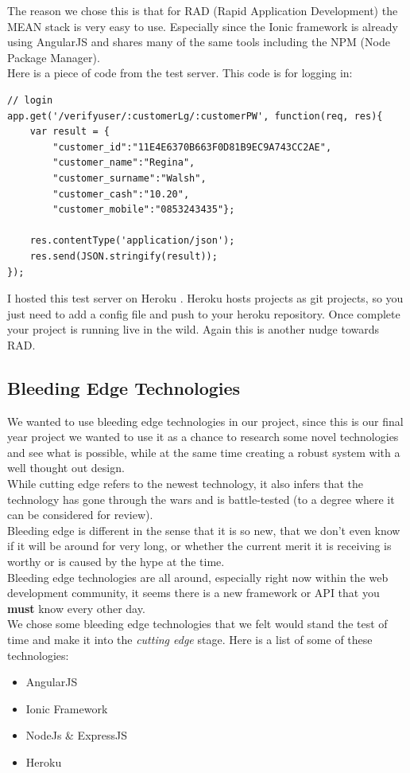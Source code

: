 The reason we chose this is that for RAD (Rapid Application Development) the MEAN stack is very easy to use.
Especially since the Ionic framework is already using AngularJS and shares many of the same tools including the NPM (Node Package Manager).
\\
\pagebreak
Here is a piece of code from the test server.
This code is for logging in:
\begin{verbatim}
// login
app.get('/verifyuser/:customerLg/:customerPW', function(req, res){
    var result = {
        "customer_id":"11E4E6370B663F0D81B9EC9A743CC2AE",
        "customer_name":"Regina",
        "customer_surname":"Walsh",
        "customer_cash":"10.20",
        "customer_mobile":"0853243435"};

    res.contentType('application/json');
    res.send(JSON.stringify(result));
});
\end{verbatim}

I hosted this test server on Heroku \cite{heroku}.
Heroku hosts projects as git projects, so you just need to add a config file and push to your heroku repository.
Once complete your project is running live in the wild.
Again this is another nudge towards RAD.

\subsection{Bleeding Edge Technologies}
We wanted to use bleeding edge technologies in our project, since this is our final year project we wanted to use it as a chance to research some novel technologies and see what is possible, while at the same time creating a robust system with a well thought out design.
\\
While cutting edge refers to the newest technology, it also infers that the technology has gone through the wars and is battle-tested (to a degree where it can be considered for review). 
\\
Bleeding edge is different in the sense that it is so new, that we don't even know if it will be around for very long, or whether the current merit it is receiving is worthy or is caused by the hype at the time.
\\
Bleeding edge technologies are all around, especially right now within the web development community, it seems there is a new framework or API that you \textbf{must} know every other day.
\\
We chose some bleeding edge technologies that we felt would stand the test of time and make it into the \textit{cutting edge} stage.
Here is a list of some of these technologies:
\begin{itemize}
	\item AngularJS
	\item Ionic Framework
	\item NodeJs \& ExpressJS
	\item Heroku
\end{itemize}

